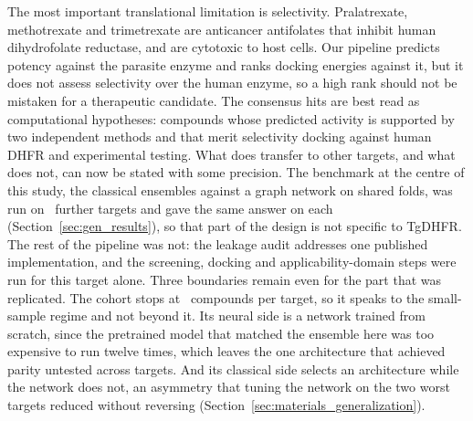 The most important translational limitation is selectivity. Pralatrexate, methotrexate and trimetrexate are anticancer antifolates that inhibit human dihydrofolate reductase, and are cytotoxic to host cells. Our pipeline predicts potency against the parasite enzyme and ranks docking energies against it, but it does not assess selectivity over the human enzyme, so a high rank should not be mistaken for a therapeutic candidate. The consensus hits are best read as computational hypotheses: compounds whose predicted activity is supported by two independent methods and that merit selectivity docking against human DHFR and experimental testing. What does transfer to other targets, and what does not, can now be stated with some precision. The benchmark at the centre of this study, the classical ensembles against a graph network on shared folds, was run on \GenNTargets\ further targets and gave the same answer on each (Section~\ref{sec:gen_results}), so that part of the design is not specific to TgDHFR. The rest of the pipeline was not: the leakage audit addresses one published implementation, and the screening, docking and applicability-domain steps were run for this target alone. Three boundaries remain even for the part that was replicated. The cohort stops at \GenMaxCompounds\ compounds per target, so it speaks to the small-sample regime and not beyond it. Its neural side is a network trained from scratch, since the pretrained model that matched the ensemble here was too expensive to run twelve times, which leaves the one architecture that achieved parity untested across targets. And its classical side selects an architecture while the network does not, an asymmetry that tuning the network on the two worst targets reduced without reversing (Section~\ref{sec:materials_generalization}).
